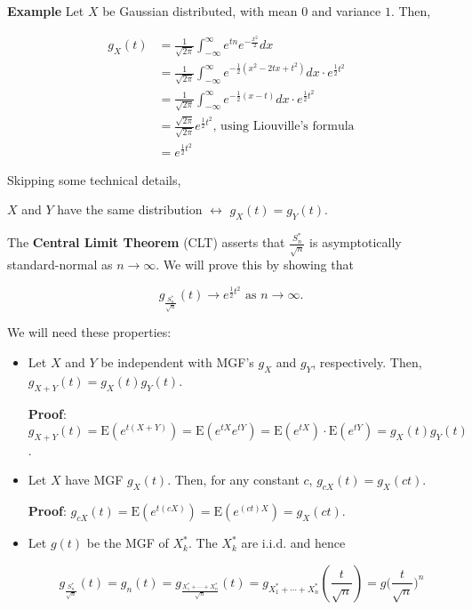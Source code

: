 \documentclass[12pt]{article}
\newcommand{\expected}[1]{\text{E}(#1)}
\begin{document}
\begin{tcolorbox}
\textbf{Example} Let $X$ be Gaussian distributed, with mean $0$ and variance $1$. Then, 

\begin{align*}
g_X(t) &= \frac{1}{\sqrt{2 \pi}} \int_{- \infty}^{\infty} e^{tn} e^{- \frac{x^2}{2}} dx \\
&=  \frac{1}{\sqrt{2 \pi}} \int_{- \infty}^{\infty} e^{- \frac{1}{2}(x^2 - 2tx + t^2)} dx \cdot e^{\frac{1}{2} t^2} \\
&= \frac{1}{\sqrt{2 \pi}} \int_{- \infty}^{\infty} e^{- \frac{1}{2}(x-t)} dx \cdot e^{\frac{1}{2} t^2} \\
&= \frac{\sqrt{2 \pi}}{\sqrt{2 \pi}} e^{\frac{1}{2} t^2} \text{, using Liouville's formula} \\
&= e^{\frac{1}{2} t^2}
\end{align*}
\end{tcolorbox}

\noindent
Skipping some technical details,

\begin{center}
$X$ and $Y$ have the same distribution $\leftrightarrow$ $g_X(t) = g_Y(t)$. 
\end{center}

\noindent
The \textbf{Central Limit Theorem} (CLT) asserts that $\frac{S_{n}^{*}}{\sqrt{n}}$ is asymptotically standard-normal as $n \rightarrow \infty$. We will prove this by showing that 

\begin{equation*}
g_{\frac{S_{n}^{*}}{\sqrt{n}}}(t) \longrightarrow e^{\frac{1}{2} t^2} \text{ as } n \rightarrow \infty. 
\end{equation*}

\noindent
We will need these properties:

\begin{itemize}
\item Let $X$ and $Y$ be independent with MGF's $g_X$ and $g_Y$, respectively. Then, $g_{X+Y}(t) = g_X(t) g_Y(t)$.

\textbf{Proof}: $g_{X+Y}(t) = \expected{ e^{t (X+Y)}} = \expected{ e^{t X} e^{t Y}} = \expected{ e^{t X}} \cdot \expected{ e^{t Y}} = g_X(t) g_Y(t)$.

\item Let $X$ have MGF $g_X(t)$. Then, for any constant $c$, $g_{cX}(t) = g_X(ct)$.

\textbf{Proof}: $g_{cX}(t) = \expected{ e^{t (cX)}} = \expected{ e^{(ct) X}} = g_X(ct)$.

\item Let $g(t)$ be the MGF of $X_{k}^{*}$. The $X_{k}^{*}$ are i.i.d. and hence 

\begin{equation*}
g_{\frac{S_{n}^{*}}{\sqrt{n}}}(t) = g_n(t) = g_{\frac{X_{1}^{*} + \cdots + X_{n}^{*}}{\sqrt{n}}} (t) = g_{X_{1}^{*} + \cdots + X_{n}^{*}}(\frac{t}{\sqrt{n}}) = g \big ( \frac{t}{\sqrt{n}} \big )^n
\end{equation*} 
\end{itemize}
\end{document}
